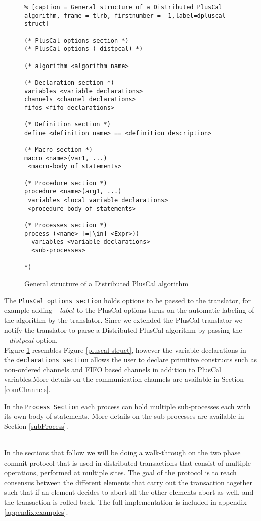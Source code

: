 \begin{figure}
\begin{lstlisting}% [caption = General structure of a Distributed PlusCal algorithm, frame = tlrb, firstnumber =  1,label=dpluscal-struct]

(* PlusCal options section *)
(* PlusCal options (-distpcal) *)

(* algorithm <algorithm name>

(* Declaration section *)
variables <variable declarations>
channels <channel declarations>
fifos <fifo declarations>

(* Definition section *)
define <definition name> == <definition description>

(* Macro section *)
macro <name>(var1, ...)
 <macro-body of statements>

(* Procedure section *)
procedure <name>(arg1, ...)
 variables <local variable declarations>
 <procedure body of statements>

(* Processes section *)
process (<name> [=|\in] <Expr>))
  variables <variable declarations>
  <sub-processes>

*)

\end{lstlisting}
\caption{General structure of a Distributed PlusCal algorithm}
\label{dpluscal-struct}
\end{figure}

The \verb|PlusCal options section| holds options to be passed to the translator, for example adding $-label$ to the PlusCal options turns on the automatic labeling of the algorithm by the translator. Since we extended the PlusCal translator we notify the translator to parse a Distributed PlusCal algorithm by passing the $-distpcal$ option.\\

Figure \ref{dpluscal-struct} resembles Figure \ref{pluscal-struct}, however the variable declarations in the \verb|declarations section| allows the user to declare primitive constructs such as non-ordered channels and FIFO based channels in addition to PlusCal variables.More details on the communication channels are available in Section \ref{comChannels}.

In the \verb|Process Section| each process can hold multiple sub-processes each with its own body of statements. More details on the sub-processes are available in Section \ref{subProcess}.


\hfill\\
In the sections that follow we will be doing a walk-through on the two phase commit protocol that is used in distributed transactions that consist of multiple operations, performed at multiple sites. The goal of the protocol is to reach consensus between the different elements that carry out the transaction together such that if an element decides to abort all the other elements abort as well, and the transaction is rolled back. The full implementation is included in appendix \ref{appendix:examples}.

